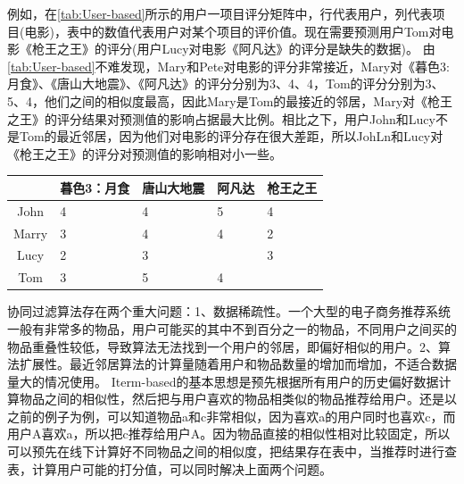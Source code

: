 \begin{enumerate}[(1)]
		例如，在\autoref{tab:User-based}所示的用户一项目评分矩阵中，行代表用户，列代表项目(电影)，表中的数值代表用户对某个项目的评价值。现在需要预测用户Tom对电影《枪王之王》的评分(用户Lucy对电影《阿凡达》的评分是缺失的数据)。
		由\autoref{tab:User-based}不难发现，Mary和Pete对电影的评分非常接近，Mary对《暮色3:月食》、《唐山大地震》、《阿凡达》的评分分别为3、4、4，Tom的评分分别为3、5、4，他们之间的相似度最高，因此Mary是Tom的最接近的邻居，Mary对《枪王之王》的评分结果对预测值的影响占据最大比例。相比之下，用户John和Lucy不是Tom的最近邻居，因为他们对电影的评分存在很大差距，所以JohLn和Lucy对《枪王之王》的评分对预测值的影响相对小一些。
		\begin{table}[htp]
		\centering
		\label{tab:User-based}
		\begin{tabular}{ |c|p{2cm}|p{2cm}|p{2cm}|p{2cm}| } \hline
		 & 暮色3：月食 & 唐山大地震 & 阿凡达 & 枪王之王 \\ \hline
		John & 4 & 4 & 5 & 4 \\ \hline
		Marry & 3 & 4 & 4 & 2 \\ \hline
		Lucy & 2 & 3 &  & 3 \\ \hline
		Tom & 3 & 5 & 4 &  \\ \hline
		\end{tabular}
		\end{table}
		\end{enumerate}
		协同过滤算法存在两个重大问题：1、数据稀疏性。一个大型的电子商务推荐系统一般有非常多的物品，用户可能买的其中不到百分之一的物品，不同用户之间买的物品重叠性较低，导致算法无法找到一个用户的邻居，即偏好相似的用户。2、算法扩展性。最近邻居算法的计算量随着用户和物品数量的增加而增加，不适合数据量大的情况使用。 Iterm-based的基本思想是预先根据所有用户的历史偏好数据计算物品之间的相似性，然后把与用户喜欢的物品相类似的物品推荐给用户。还是以之前的例子为例，可以知道物品a和c非常相似，因为喜欢a的用户同时也喜欢c，而用户A喜欢a，所以把c推荐给用户A。因为物品直接的相似性相对比较固定，所以可以预先在线下计算好不同物品之间的相似度，把结果存在表中，当推荐时进行查表，计算用户可能的打分值，可以同时解决上面两个问题。

